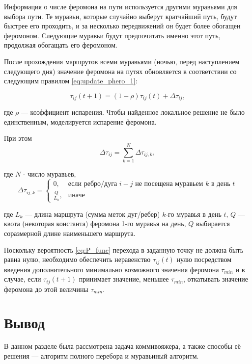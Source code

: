 Информация о числе феромона на пути используется другими муравьями для выбора пути. 
Те муравьи, которые случайно выберут кратчайший путь, будут быстрее его проходить, и за несколько передвижений он будет более обогащен феромоном. 
Cледующие муравьи будут предпочитать именно этот путь, продолжая обогащать его феромоном. 

После прохождения маршрутов всеми муравьями (ночью, перед наступлением следующего дня) значение феромона на путях обновляется в соответствии со следующим правилом \eqref{eq:update_phero_1}:

\begin{equation}
	\label{eq:update_phero_1}
	\tau_{ij}(t+1) = (1-\rho)\tau_{ij}(t) + \Delta \tau_{ij},
\end{equation}

где $\rho$ --- коэффициент испарения. 
Чтобы найденное локальное решение не было единственным, моделируется испарение феромона.

При этом
\begin{equation}
	\label{update_phero_2}
	\Delta \tau_{ij} = \sum_{k=1}^N \Delta\tau_{ij, k},
\end{equation}

где $N$ - число муравьев,
\begin{equation}
	\label{update_phero_3}
	\Delta\tau_{ij,k} = 
	\begin{cases}
		0,  & \textrm{если ребро/дуга $i-j$ не посещена муравьем $k$ в день $t$} \\
		\frac{Q}{L_{k}}, & \textrm{иначе} 
	\end{cases}
\end{equation}

где $L_{k}$ --- длина маршрута (сумма меток дуг/ребер) $k$-го муравья в день $t$, $Q$ --- квота (некоторая константа) феромона 1-го муравья на день, $Q$ выбирается соразмерной длине наименьшего маршрута.

Поскольку вероятность \ref{eq:P_func} перехода в заданную точку не должна быть равна нулю, необходимо обеспечить неравенство $\tau_{ij}(t)$ нулю посредством введения дополнительного минимально возможного значения феромона $\tau_{min}$  и в случае, если $\tau_{ij}(t+1)$ принимает значение, меньшее $\tau_{min}$, откатывать значение феромона до этой величины $\tau_{min}$.

\section*{Вывод}

В данном разделе была рассмотрена задача коммивояжера, а также способы её решения --- алгоритм полного перебора и муравьиный алгоритм.
